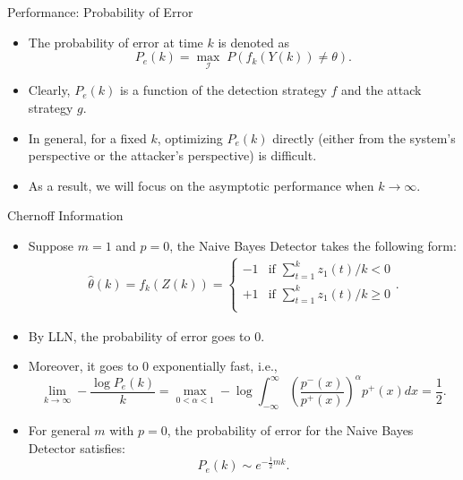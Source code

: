\documentclass[10pt]{beamer}
\begin{document}
 \begin{frame}{Performance: Probability of Error}
   \begin{itemize}
   \item The probability of error at time $k$ is denoted as
     \begin{displaymath}
       P_e(k) = \max_{\mathcal I}\; P(f_k(Y(k)) \neq \theta). 
     \end{displaymath}
   \item Clearly, $P_e(k)$ is a function of the detection strategy $f$ and the attack strategy $g$.
   \item  In general, for a fixed $k$, optimizing $P_e(k)$ directly (either from the system's perspective or the attacker's perspective) is difficult.
   \item As a result, we will focus on the asymptotic performance when $k\rightarrow\infty$.
   \end{itemize}
 \end{frame}
 
 \begin{frame}{Chernoff Information}
   \begin{itemize}
   \item Suppose $m = 1$ and $p = 0$, the Naive Bayes Detector takes the following form:
     \begin{align*}
       \hat \theta(k)=f_k(Z(k))=\begin{cases}
         -1 &\text{if }\sum_{t=1}^k z_1(t)/k < 0\\
         +1 &\text{if }\sum_{t=1}^k z_1(t)/k \geq 0\\
       \end{cases}.
     \end{align*}
   \item By LLN, the probability of error goes to $0$.
   \item Moreover, it goes to $0$ exponentially fast, i.e.,
     \begin{displaymath}
       \lim_{k\rightarrow\infty}-\frac{\log P_e(k)}{k} = \max_{0<\alpha<1} -\log \int_{-\infty}^\infty \left(\frac{p^-(x)}{p^+(x)}\right)^\alpha p^+(x) dx = \frac{1}{2}.
     \end{displaymath}
   \item For general $m$ with $p = 0$, the probability of error for the Naive Bayes Detector satisfies:
     \begin{displaymath}
       P_e(k)\sim e^{-\frac{1}{2}mk}.
     \end{displaymath}
   \end{itemize}
 \end{frame}
 
\end{document}
